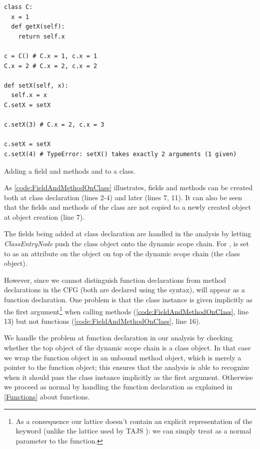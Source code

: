 \begin{listing}[H]
	\begin{verbatim}
class C:
  x = 1
  def getX(self):
    return self.x

c = C() # C.x = 1, c.x = 1
C.x = 2 # C.x = 2, c.x = 2

def setX(self, x):
  self.x = x
C.setX = setX

c.setX(3) # C.x = 2, c.x = 3

c.setX = setX
c.setX(4) # TypeError: setX() takes exactly 2 arguments (1 given)
	\end{verbatim}
	\caption{Adding a field  and methods  and  to a class.}
	\label{code:FieldAndMethodOnClass}
\end{listing}

As \autoref{code:FieldAndMethodOnClass} illustrates, fields and methods can be created both at class declaration (lines 2-4) and later (lines 7, 11). It can also be seen that the fields and methods of the class are not copied to a newly created object at object creation (line 7).

The fields being added at class declaration are handled in the analysis by letting \textit{ClassEntryNode} push the class object onto the dynamic scope chain. For ,  is set to  as an attribute on the object on top of the dynamic scope chain (the class object).

However, since we cannot distinguish function declarations from method declarations in the CFG (both are declared using the  syntax),  will appear as a function declaration. One problem is that the class instance is given implicitly as the first argument\footnote{As a consequence our lattice doesn't contain an explicit representation of the  keyword (unlike the lattice used by TAJS \cite{tajs}): we can simply treat  as a normal parameter to the function.} when calling methods (\autoref{code:FieldAndMethodOnClass}, line 13) but not functions (\autoref{code:FieldAndMethodOnClass}, line 16).

We handle the problem at function declaration in our analysis by checking whether the top object of the dynamic scope chain is a class object. In that case we wrap the function object in an unbound method object, which is merely a pointer to the function object; this ensures that the analysis is able to recognize when it should pass the class instance implicitly as the first argument. Otherwise we proceed as normal by handling the function declaration as explained in \autoref{Functions} about functions.

